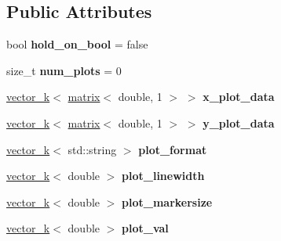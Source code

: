 \subsection*{Public Attributes}
\begin{DoxyCompactItemize}
\item 
\hypertarget{classkeycpp_1_1_plots_afe961c1f35d88bc181bd426fc47ade00}{bool {\bfseries hold\-\_\-on\-\_\-bool} = false}\label{classkeycpp_1_1_plots_afe961c1f35d88bc181bd426fc47ade00}

\item 
\hypertarget{classkeycpp_1_1_plots_ad3b0aabd8ea6dc14a690fe6b1e37852d}{size\-\_\-t {\bfseries num\-\_\-plots} = 0}\label{classkeycpp_1_1_plots_ad3b0aabd8ea6dc14a690fe6b1e37852d}

\item 
\hypertarget{classkeycpp_1_1_plots_afcf9625ba05d1814a1f452525a1171a1}{\hyperlink{classkeycpp_1_1vector__k}{vector\-\_\-k}$<$ \hyperlink{classkeycpp_1_1matrix}{matrix}$<$ double, 1 $>$ $>$ {\bfseries x\-\_\-plot\-\_\-data}}\label{classkeycpp_1_1_plots_afcf9625ba05d1814a1f452525a1171a1}

\item 
\hypertarget{classkeycpp_1_1_plots_a4f4dca5ee8235c6c698a0eb0b7fa2f17}{\hyperlink{classkeycpp_1_1vector__k}{vector\-\_\-k}$<$ \hyperlink{classkeycpp_1_1matrix}{matrix}$<$ double, 1 $>$ $>$ {\bfseries y\-\_\-plot\-\_\-data}}\label{classkeycpp_1_1_plots_a4f4dca5ee8235c6c698a0eb0b7fa2f17}

\item 
\hypertarget{classkeycpp_1_1_plots_a8665d63b8f7098941f9c6e9369edae3c}{\hyperlink{classkeycpp_1_1vector__k}{vector\-\_\-k}$<$ std\-::string $>$ {\bfseries plot\-\_\-format}}\label{classkeycpp_1_1_plots_a8665d63b8f7098941f9c6e9369edae3c}

\item 
\hypertarget{classkeycpp_1_1_plots_a5229077ae64f278530c2c153c6925e7d}{\hyperlink{classkeycpp_1_1vector__k}{vector\-\_\-k}$<$ double $>$ {\bfseries plot\-\_\-linewidth}}\label{classkeycpp_1_1_plots_a5229077ae64f278530c2c153c6925e7d}

\item 
\hypertarget{classkeycpp_1_1_plots_a6875dffbe632094e898e907acfdf865d}{\hyperlink{classkeycpp_1_1vector__k}{vector\-\_\-k}$<$ double $>$ {\bfseries plot\-\_\-markersize}}\label{classkeycpp_1_1_plots_a6875dffbe632094e898e907acfdf865d}

\item 
\hypertarget{classkeycpp_1_1_plots_ab67ed9d8c321380f223baea8f05630ed}{\hyperlink{classkeycpp_1_1vector__k}{vector\-\_\-k}$<$ double $>$ {\bfseries plot\-\_\-val}}\label{classkeycpp_1_1_plots_ab67ed9d8c321380f223baea8f05630ed}


\end{DoxyCompactItemize}

